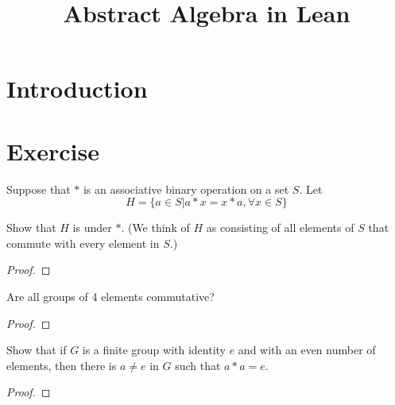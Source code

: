 \title{Abstract Algebra in Lean}




\maketitle


\tableofcontents
\section{Introduction}



\section{Exercise}

\nocite{*} %

\begin{theorem}[Exercise 1]\label{Ex1}
  \leanok
    Suppose that $*$ is an associative binary operation on a set $S$. Let
    $$
    H = \{a\in S | a * x = x * a, \forall x\in S\}
    $$

    Show that $H$ is under $*$. (We think of $H$ as consisting of all elements of $S$ that commute with every element in $S$.)
\end{theorem}
\begin{proof}
  \leanok
\end{proof}


\begin{theorem}[Exercise 2]\label{Ex2}
  \leanok
    Are all groups of 4 elements commutative?
\end{theorem}
\begin{proof}
  \leanok
\end{proof}


\begin{theorem}[Exercise 3]\label{Ex3}
  \leanok
    Show that if $G$ is a finite group with identity $e$ and with an even number of elements, then there is $a \ne e$ in $G$ such that $a * a = e$.
\end{theorem}
\begin{proof}
  \leanok
\end{proof}


